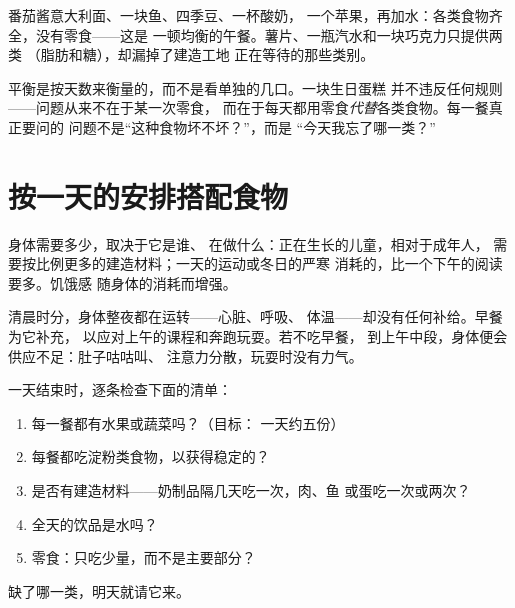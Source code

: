 \begin{example}[搭配一份午餐]\label{ex:g3:balanced-diet:lunch}
番茄酱意大利面、一块鱼、四季豆、一杯酸奶，
一个苹果，再加水：各类食物齐全，没有零食——这是
一顿均衡的午餐。薯片、一瓶汽水和一块巧克力只提供两类
（脂肪和糖），却漏掉了建造工地
正在等待的那些类别。
\end{example}

\begin{remark}\label{rem:g3:balanced-diet:balance}
平衡是按天数来衡量的，而不是看单独的几口。一块生日蛋糕
并不违反任何规则——问题从来不在于某一次零食，
而在于每天都用零食\emph{代替}各类食物。每一餐真正要问的
问题不是“这种食物坏不坏？”，而是
“今天我忘了哪一类？”
\end{remark}

\section{按一天的安排搭配食物}

\begin{proposition}[需求随一天的安排与每个人而变]\label{prop:g3:balanced-diet:needs}
身体需要多少，取决于它是谁、
在做什么：正在生长的儿童，相对于成年人，
需要按比例更多的建造材料；一天的运动或冬日的严寒
消耗的，比一个下午的阅读要多。饥饿感
随身体的消耗而增强。
\end{proposition}
\admitted

\begin{example}[早餐为什么重要]\label{ex:g3:balanced-diet:breakfast}
清晨时分，身体整夜都在运转——心脏、呼吸、
体温——却没有任何补给。早餐为它补充，
以应对上午的课程和奔跑玩耍。若不吃早餐，
到上午中段，身体便会供应不足：肚子咕咕叫、
注意力分散，玩耍时没有力气。
\end{example}

\begin{method}[检查一天的膳食平衡]\label{met:g3:balanced-diet:check}
一天结束时，逐条检查下面的清单：
\begin{enumerate}
  \item 每一餐都有水果或蔬菜吗？（目标：
        一天约五份）
  \item 每餐都吃淀粉类食物，以获得稳定的？
  \item 是否有建造材料——奶制品隔几天吃一次，肉、鱼
        或蛋吃一次或两次？
  \item 全天的饮品是水吗？
  \item 零食：只吃少量，而不是主要部分？
\end{enumerate}
缺了哪一类，明天就请它来。
\end{method}


